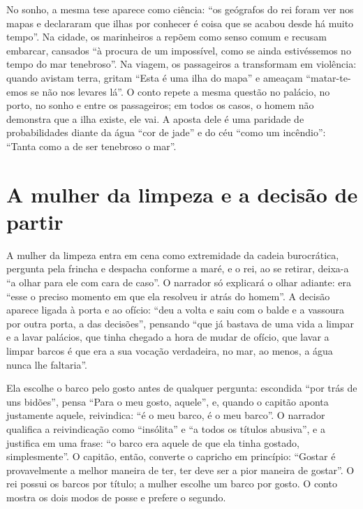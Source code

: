 \documentclass[12pt]{article}
\begin{document}
No sonho, a mesma tese aparece como ciência: ``os geógrafos do rei foram ver nos mapas e declararam que ilhas por conhecer é coisa que se acabou desde há muito tempo''. Na cidade, os marinheiros a repõem como senso comum e recusam embarcar, cansados ``à procura de um impossível, como se ainda estivéssemos no tempo do mar tenebroso''. Na viagem, os passageiros a transformam em violência: quando avistam terra, gritam ``Esta é uma ilha do mapa'' e ameaçam ``matar-te-emos se não nos levares lá''. O conto repete a mesma questão no palácio, no porto, no sonho e entre os passageiros; em todos os casos, o homem não demonstra que a ilha existe, ele vai. A aposta dele é uma paridade de probabilidades diante da água ``cor de jade'' e do céu ``como um incêndio'': ``Tanta como a de ser tenebroso o mar''.

\section{A mulher da limpeza e a decisão de partir}

A mulher da limpeza entra em cena como extremidade da cadeia burocrática, pergunta pela frincha e despacha conforme a maré, e o rei, ao se retirar, deixa-a ``a olhar para ele com cara de caso''. O narrador só explicará o olhar adiante: era ``esse o preciso momento em que ela resolveu ir atrás do homem''. A decisão aparece ligada à porta e ao ofício: ``deu a volta e saiu com o balde e a vassoura por outra porta, a das decisões'', pensando ``que já bastava de uma vida a limpar e a lavar palácios, que tinha chegado a hora de mudar de ofício, que lavar a limpar barcos é que era a sua vocação verdadeira, no mar, ao menos, a água nunca lhe faltaria''.

Ela escolhe o barco pelo gosto antes de qualquer pergunta: escondida ``por trás de uns bidões'', pensa ``Para o meu gosto, aquele'', e, quando o capitão aponta justamente aquele, reivindica: ``é o meu barco, é o meu barco''. O narrador qualifica a reivindicação como ``insólita'' e ``a todos os títulos abusiva'', e a justifica em uma frase: ``o barco era aquele de que ela tinha gostado, simplesmente''. O capitão, então, converte o capricho em princípio: ``Gostar é provavelmente a melhor maneira de ter, ter deve ser a pior maneira de gostar''. O rei possui os barcos por título; a mulher escolhe um barco por gosto. O conto mostra os dois modos de posse e prefere o segundo.
\end{document}
